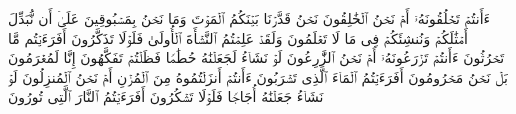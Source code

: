 ءَأَنتُمۡ تَخۡلُقُونَهُۥۤ أَمۡ نَحۡنُ ٱلۡخَٰلِقُونَ%
\stopbuffer
\startbuffer[\q:56:60]
نَحۡنُ قَدَّرۡنَا بَیۡنَكُمُ ٱلۡمَوۡتَ وَمَا نَحۡنُ بِمَسۡبُوقِینَ%
\stopbuffer
\startbuffer[\q:56:61]
عَلَىٰۤ أَن نُّبَدِّلَ أَمۡثَٰلَكُمۡ وَنُنشِئَكُمۡ فِی مَا لَا تَعۡلَمُونَ%
\stopbuffer
\startbuffer[\q:56:62]
وَلَقَدۡ عَلِمۡتُمُ ٱلنَّشۡأَةَ ٱلۡأُولَىٰ فَلَوۡلَا تَذَكَّرُونَ%
\stopbuffer
\startbuffer[\q:56:63]
أَفَرَءَیۡتُم مَّا تَحۡرُثُونَ%
\stopbuffer
\startbuffer[\q:56:64]
ءَأَنتُمۡ تَزۡرَعُونَهُۥۤ أَمۡ نَحۡنُ ٱلزَّٰرِعُونَ%
\stopbuffer
\startbuffer[\q:56:65]
لَوۡ نَشَاۤءُ لَجَعَلۡنَٰهُ حُطَٰمࣰا فَظَلۡتُمۡ تَفَكَّهُونَ%
\stopbuffer
\startbuffer[\q:56:66]
إِنَّا لَمُغۡرَمُونَ%
\stopbuffer
\startbuffer[\q:56:67]
بَلۡ نَحۡنُ مَحۡرُومُونَ%
\stopbuffer
\startbuffer[\q:56:68]
أَفَرَءَیۡتُمُ ٱلۡمَاۤءَ ٱلَّذِی تَشۡرَبُونَ%
\stopbuffer
\startbuffer[\q:56:69]
ءَأَنتُمۡ أَنزَلۡتُمُوهُ مِنَ ٱلۡمُزۡنِ أَمۡ نَحۡنُ ٱلۡمُنزِلُونَ%
\stopbuffer
\startbuffer[\q:56:70]
لَوۡ نَشَاۤءُ جَعَلۡنَٰهُ أُجَاجࣰا فَلَوۡلَا تَشۡكُرُونَ%
\stopbuffer
\startbuffer[\q:56:71]
أَفَرَءَیۡتُمُ ٱلنَّارَ ٱلَّتِی تُورُونَ%
\stopbuffer

